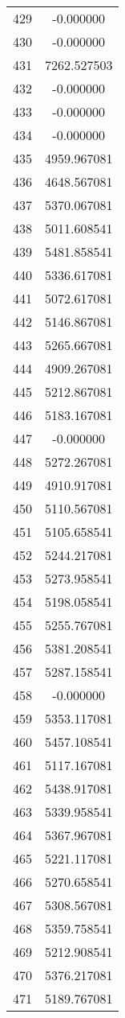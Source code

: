 \documentclass[12pt]{article}
\begin{document}
\begin{longtable}{@{}cc@{}}
429 & -0.000000 \\
430 & -0.000000 \\
431 & 7262.527503 \\
432 & -0.000000 \\
433 & -0.000000 \\
434 & -0.000000 \\
435 & 4959.967081 \\
436 & 4648.567081 \\
437 & 5370.067081 \\
438 & 5011.608541 \\
439 & 5481.858541 \\
440 & 5336.617081 \\
441 & 5072.617081 \\
442 & 5146.867081 \\
443 & 5265.667081 \\
444 & 4909.267081 \\
445 & 5212.867081 \\
446 & 5183.167081 \\
447 & -0.000000 \\
448 & 5272.267081 \\
449 & 4910.917081 \\
450 & 5110.567081 \\
451 & 5105.658541 \\
452 & 5244.217081 \\
453 & 5273.958541 \\
454 & 5198.058541 \\
455 & 5255.767081 \\
456 & 5381.208541 \\
457 & 5287.158541 \\
458 & -0.000000 \\
459 & 5353.117081 \\
460 & 5457.108541 \\
461 & 5117.167081 \\
462 & 5438.917081 \\
463 & 5339.958541 \\
464 & 5367.967081 \\
465 & 5221.117081 \\
466 & 5270.658541 \\
467 & 5308.567081 \\
468 & 5359.758541 \\
469 & 5212.908541 \\
470 & 5376.217081 \\
471 & 5189.767081 \\

\end{longtable}
\end{document}

